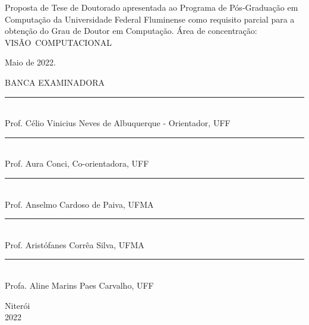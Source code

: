 \noindent
\begin{flushright}
\begin{minipage}[t]{10cm}
Proposta de Tese de Doutorado apresentada ao Programa de P\'{o}s-Gradua\c{c}\~{a}o em Computa\c{c}\~{a}o da Universidade Federal Fluminense como requisito parcial para a obten\c{c}\~{a}o do \mbox{Grau} de Doutor em Computa\c{c}\~{a}o. \'{A}rea de concentra\c{c}\~{a}o: \mbox{VIS\~{A}O COMPUTACIONAL} %

\end{minipage}
\end{flushright}
\vspace{0.5 cm}
\noindent
Maio de 2022. \\
\begin{flushright}
  {
  \begin{center}
  BANCA EXAMINADORA \\
  \vspace{5mm}
  \rule{11cm}{.1mm} \\
    Prof. Célio Vinicius Neves de Albuquerque - Orientador, UFF \\
    \vspace{3mm}
  \rule{11cm}{.1mm} \\
    Prof. Aura Conci, Co-orientadora, UFF\\
    \vspace{3mm}
  \rule{11cm}{.1mm} \\
    Prof. Anselmo Cardoso de Paiva, UFMA\\
  \vspace{3mm}
  \rule{11cm}{.1mm} \\
    Prof. Aristófanes Corrêa Silva, UFMA\\
    \vspace{3mm}
  \rule{11cm}{.1mm} \\
    Profa. Aline Marins Paes Carvalho, UFF\\
  \vspace{3mm}
  \end{center}
  }
\end{flushright}
\begin{center}
  \vspace{3mm}
  Niter\'{o}i \\
  2022

\end{center}

\cleardoublepage
\thispagestyle{empty}
\vspace*{200mm}

